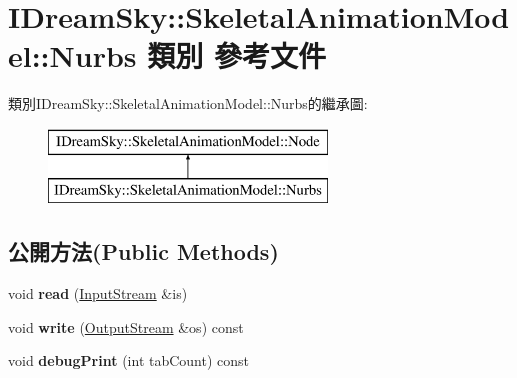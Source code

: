 \hypertarget{class_i_dream_sky_1_1_skeletal_animation_model_1_1_nurbs}{}\section{I\+Dream\+Sky\+:\+:Skeletal\+Animation\+Model\+:\+:Nurbs 類別 參考文件}
\label{class_i_dream_sky_1_1_skeletal_animation_model_1_1_nurbs}
類別\+I\+Dream\+Sky\+:\+:Skeletal\+Animation\+Model\+:\+:Nurbs的繼承圖\+:\begin{figure}[H]
\begin{center}
\leavevmode
\includegraphics[height=2.000000cm]{class_i_dream_sky_1_1_skeletal_animation_model_1_1_nurbs}
\end{center}
\end{figure}
\subsection*{公開方法(Public Methods)}
\begin{DoxyCompactItemize}
\item 
void {\bfseries read} (\hyperlink{class_i_dream_sky_1_1_input_stream}{Input\+Stream} \&is)\hypertarget{class_i_dream_sky_1_1_skeletal_animation_model_1_1_nurbs_a2c90b560264f2cdfbc5b360737e6c6ed}{}\label{class_i_dream_sky_1_1_skeletal_animation_model_1_1_nurbs_a2c90b560264f2cdfbc5b360737e6c6ed}

\item 
void {\bfseries write} (\hyperlink{class_i_dream_sky_1_1_output_stream}{Output\+Stream} \&os) const \hypertarget{class_i_dream_sky_1_1_skeletal_animation_model_1_1_nurbs_a348269e7b5015833b9f32a14a99e743b}{}\label{class_i_dream_sky_1_1_skeletal_animation_model_1_1_nurbs_a348269e7b5015833b9f32a14a99e743b}

\item 
void {\bfseries debug\+Print} (int tab\+Count) const \hypertarget{class_i_dream_sky_1_1_skeletal_animation_model_1_1_nurbs_a5cc62c2a76784fba4f97988e486839b2}{}\label{class_i_dream_sky_1_1_skeletal_animation_model_1_1_nurbs_a5cc62c2a76784fba4f97988e486839b2}

\end{DoxyCompactItemize}
